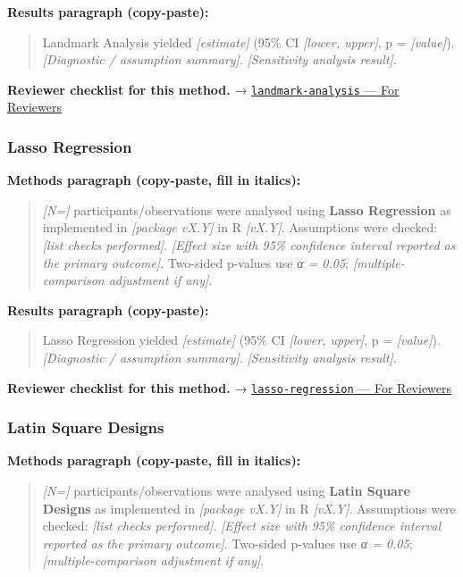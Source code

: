\documentclass[
]{article}
\begin{document}
\textbf{Results paragraph (copy-paste):}

\begin{quote}
Landmark Analysis yielded \emph{{[}estimate{]}} (95\% CI \emph{{[}lower,
upper{]}}, p = \emph{{[}value{]}}). \emph{{[}Diagnostic / assumption
summary{]}}. \emph{{[}Sensitivity analysis result{]}}.
\end{quote}

\textbf{Reviewer checklist for this method.} →
\href{../chapters/11-survival/landmark-analysis.Rmd\#for-reviewers}{\texttt{landmark-analysis}
--- For Reviewers}

\subsubsection{Lasso Regression}\label{lasso-regression}

\textbf{Methods paragraph (copy-paste, fill in italics):}

\begin{quote}
\emph{{[}N={]}} participants/observations were analysed using
\textbf{Lasso Regression} as implemented in \emph{{[}package vX.Y{]}} in
R \emph{{[}vX.Y{]}}. Assumptions were checked: \emph{{[}list checks
performed{]}}. \emph{{[}Effect size with 95\% confidence interval
reported as the primary outcome{]}}. Two-sided p-values use \emph{α =
0.05}; \emph{{[}multiple-comparison adjustment if any{]}}.
\end{quote}

\textbf{Results paragraph (copy-paste):}

\begin{quote}
Lasso Regression yielded \emph{{[}estimate{]}} (95\% CI \emph{{[}lower,
upper{]}}, p = \emph{{[}value{]}}). \emph{{[}Diagnostic / assumption
summary{]}}. \emph{{[}Sensitivity analysis result{]}}.
\end{quote}

\textbf{Reviewer checklist for this method.} →
\href{../chapters/07-regression/lasso-regression.Rmd\#for-reviewers}{\texttt{lasso-regression}
--- For Reviewers}

\subsubsection{Latin Square Designs}\label{latin-square-designs}

\textbf{Methods paragraph (copy-paste, fill in italics):}

\begin{quote}
\emph{{[}N={]}} participants/observations were analysed using
\textbf{Latin Square Designs} as implemented in \emph{{[}package
vX.Y{]}} in R \emph{{[}vX.Y{]}}. Assumptions were checked: \emph{{[}list
checks performed{]}}. \emph{{[}Effect size with 95\% confidence interval
reported as the primary outcome{]}}. Two-sided p-values use \emph{α =
0.05}; \emph{{[}multiple-comparison adjustment if any{]}}.
\end{quote}
\end{document}
